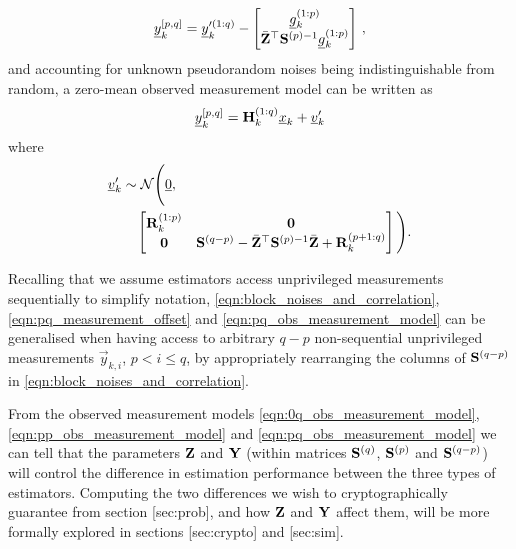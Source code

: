 \begin{description}
\begin{equation}
    {\underline{y}}_k^{[p,q]}={\underline{y}}_k^{\prime(1:q)} - 
    \begin{bmatrix}
      {\underline{g}}_k^{(1:p)}\\
      \bar{{{\mathbf{Z}}}}^\top{\ensuremath{{\mathbf{S}}}}^{(p)-1}{\underline{g}}_k^{(1:p)}
    \end{bmatrix}\,,
  \end{equation}
  and accounting for unknown pseudorandom noises being indistinguishable from random, a zero-mean observed measurement model can be written as
  \begin{equation}\label{eqn:pq_obs_measurement_model}
    {\underline{y}}_k^{[p,q]} = {{\mathbf{H}}}_k^{(1:q)}{\underline{x}}_k + {\underline{v}}_k^{\prime}
  \end{equation}
  where 
  \begin{equation*}
    \begin{split}
      &{\underline{v}}_k^{\prime} \sim \mathcal{N}\Bigg({\underline{0}},\\
      &\qquad 
      \begin{bmatrix}
        {\ensuremath{{\mathbf{R}}}}_k^{(1:p)} & {{\mathbf{0}}}\\
        {{\mathbf{0}}} & {{\mathbf{S}}}^{(q-p)} - \bar{{{\mathbf{Z}}}}^\top{\ensuremath{{\mathbf{S}}}}^{(p)-1}\bar{{{\mathbf{Z}}}} + {{\mathbf{R}}}_k^{(p+1:q)}
      \end{bmatrix}\Bigg).
    \end{split}
  \end{equation*}
\end{description}
\begin{remark}
  Recalling that we assume estimators access unprivileged measurements sequentially to simplify notation, \eqref{eqn:block_noises_and_correlation}, \eqref{eqn:pq_measurement_offset} and \eqref{eqn:pq_obs_measurement_model} can be generalised when having access to arbitrary $q-p$ non-sequential unprivileged measurements $\vec{y}_{k,i}$, $p<i\leq q$, by appropriately rearranging the columns of ${{\mathbf{S}}}^{(q-p)}$ in \eqref{eqn:block_noises_and_correlation}.
\end{remark}

From the observed measurement models \eqref{eqn:0q_obs_measurement_model}, \eqref{eqn:pp_obs_measurement_model} and \eqref{eqn:pq_obs_measurement_model} we can tell that the parameters ${{\mathbf{Z}}}$ and ${{\mathbf{Y}}}$ (within matrices ${{\mathbf{S}}}^{(q)}$, ${{\mathbf{S}}}^{(p)}$ and ${{\mathbf{S}}}^{(q-p)}$) will control the difference in estimation performance between the three types of estimators. Computing the two differences we wish to cryptographically guarantee from section [sec:prob], and how ${{\mathbf{Z}}}$ and ${{\mathbf{Y}}}$ affect them, will be more formally explored in sections [sec:crypto] and [sec:sim].

